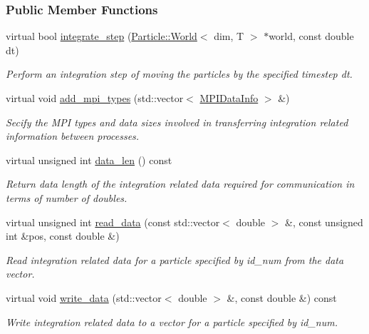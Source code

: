 \subsubsection*{Public Member Functions}
\begin{DoxyCompactItemize}
\item 
virtual bool \hyperlink{classps__mmm_1_1_particle_1_1_integrator_1_1_euler_integrator_af532d448a98f6202509183e2bc84cfc7}{integrate\+\_\+step} (\hyperlink{classps__mmm_1_1_particle_1_1_world}{Particle\+::\+World}$<$ dim, T $>$ $\ast$world, const double dt)
\begin{DoxyCompactList}\small\item\em Perform an integration step of moving the particles by the specified timestep dt. \end{DoxyCompactList}\item 
virtual void \hyperlink{classps__mmm_1_1_particle_1_1_integrator_1_1_euler_integrator_a44c5a363e86f8ed107c89b6d38d23cb9}{add\+\_\+mpi\+\_\+types} (std\+::vector$<$ \hyperlink{classps__mmm_1_1_particle_1_1_m_p_i_data_info}{M\+P\+I\+Data\+Info} $>$ \&)
\begin{DoxyCompactList}\small\item\em Secify the M\+P\+I types and data sizes involved in transferring integration related information between processes. \end{DoxyCompactList}\item 
virtual unsigned int \hyperlink{classps__mmm_1_1_particle_1_1_integrator_1_1_euler_integrator_a828d3ce7730bc4faf56709f0d026f132}{data\+\_\+len} () const 
\begin{DoxyCompactList}\small\item\em Return data length of the integration related data required for communication in terms of number of doubles. \end{DoxyCompactList}\item 
virtual unsigned int \hyperlink{classps__mmm_1_1_particle_1_1_integrator_1_1_euler_integrator_aa34c86ccfa31bdf02205546f4d57d722}{read\+\_\+data} (const std\+::vector$<$ double $>$ \&, const unsigned int \&pos, const double \&)
\begin{DoxyCompactList}\small\item\em Read integration related data for a particle specified by id\+\_\+num from the data vector. \end{DoxyCompactList}\item 
virtual void \hyperlink{classps__mmm_1_1_particle_1_1_integrator_1_1_euler_integrator_a6e86fe0923c8edb062fe8e713a9bf884}{write\+\_\+data} (std\+::vector$<$ double $>$ \&, const double \&) const 
\begin{DoxyCompactList}\small\item\em Write integration related data to a vector for a particle specified by id\+\_\+num. \end{DoxyCompactList}\end{DoxyCompactItemize}


